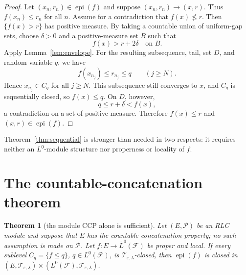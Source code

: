 \documentclass[11pt]{article}
\newtheorem{theorem}{Theorem}
\newcommand{\Lzero}{L^0(\mathcal F)}
\newcommand{\Tep}{\mathcal T_{\varepsilon,\lambda}}
\newcommand{\epi}{\operatorname{epi}}
\begin{document}
\begin{proof}
Let $(x_n,r_n)\in\epi(f)$ and suppose $(x_n,r_n)\to(x,r)$.  Thus
$f(x_n)\leq r_n$ for all $n$.  Assume for a contradiction that
$f(x)\nleq r$.  Then $\{f(x)>r\}$ has positive measure.  By taking a
countable union of uniform-gap sets, choose $\delta>0$ and a
positive-measure set $B$ such that
\[
f(x)>r+2\delta\quad\text{on }B.
\]
Apply Lemma~\ref{lem:envelope}.  For the resulting subsequence, tail, set
$D$, and random variable $q$, we have
\[
f(x_{n_j})\leq r_{n_j}\leq q\qquad(j\geq N).
\]
Hence $x_{n_j}\in C_q$ for all $j\geq N$.  This subsequence still converges
to $x$, and $C_q$ is sequentially closed, so $f(x)\leq q$.  On $D$, however,
\[
q\leq r+\delta<f(x),
\]
a contradiction on a set of positive measure.  Therefore $f(x)\leq r$ and
$(x,r)\in\epi(f)$.
\end{proof}

Theorem~\ref{thm:sequential} is stronger than needed in two respects: it
requires neither an $L^0$-module structure nor properness or locality of $f$.

\section{The countable-concatenation theorem}

\begin{theorem}[the module CCP alone is sufficient]
\label{thm:ccp}
Let $(E,\mathcal P)$ be an RLC module and suppose that $E$ has the countable
concatenation property; no such assumption is made on $\mathcal P$.  Let
$f:E\to\overline L^0(\mathcal F)$ be proper and local.  If every sublevel
$C_q=\{f\leq q\}$, $q\in\Lzero$, is $\Tep$-closed, then $\epi(f)$ is closed
in $(E,\Tep)\times(\Lzero,\Tep)$.
\end{theorem}
\end{document}
